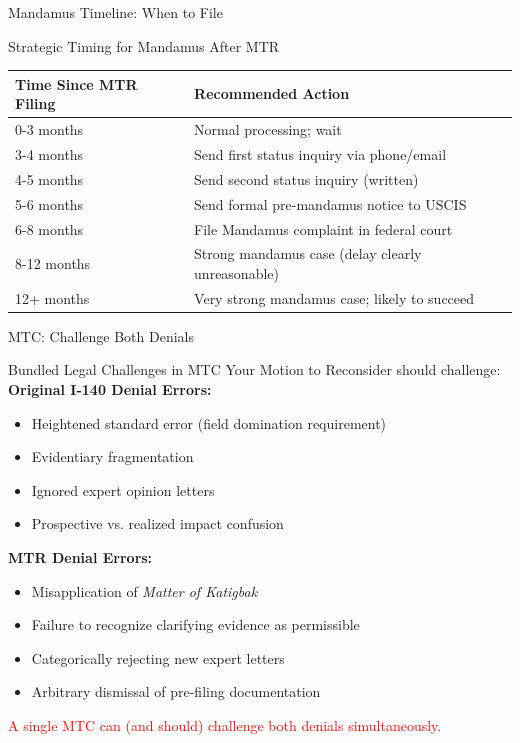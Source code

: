 \documentclass[11pt]{beamer}
\begin{document}
	\begin{frame}{Mandamus Timeline: When to File}
		\scriptsize
		\begin{block}{Strategic Timing for Mandamus After MTR}
			\begin{tabular}{|p{3cm}|p{6cm}|}
				\hline
				\textbf{Time Since MTR Filing} & \textbf{Recommended Action} \\
				\hline
				0-3 months & Normal processing; wait \\
				\hline
				3-4 months & Send first status inquiry via phone/email \\
				\hline
				4-5 months & Send second status inquiry (written) \\
				\hline
				5-6 months & Send formal pre-mandamus notice to USCIS \\
				\hline
				6-8 months & File Mandamus complaint in federal court \\
				\hline
				8-12 months & Strong mandamus case (delay clearly unreasonable) \\
				\hline
				12+ months & Very strong mandamus case; likely to succeed \\
				\hline
			\end{tabular}
		\end{block}
	\end{frame}
	
	\begin{frame}{MTC: Challenge Both Denials}
		\scriptsize
		\begin{block}{Bundled Legal Challenges in MTC}
			Your Motion to Reconsider should challenge:
			\vspace{0.2cm}
			\textbf{Original I-140 Denial Errors:}
			\begin{itemize}
				\item Heightened standard error (field domination requirement)
				\item Evidentiary fragmentation
				\item Ignored expert opinion letters
				\item Prospective vs. realized impact confusion
			\end{itemize}
			\textbf{MTR Denial Errors:}
			\begin{itemize}
				\item Misapplication of \textit{Matter of Katigbak}
				\item Failure to recognize clarifying evidence as permissible
				\item Categorically rejecting new expert letters
				\item Arbitrary dismissal of pre-filing documentation
			\end{itemize}
			\textcolor{red}{A single MTC can (and should) challenge both denials simultaneously.}
		\end{block}
	\end{frame}
	
\end{document}
